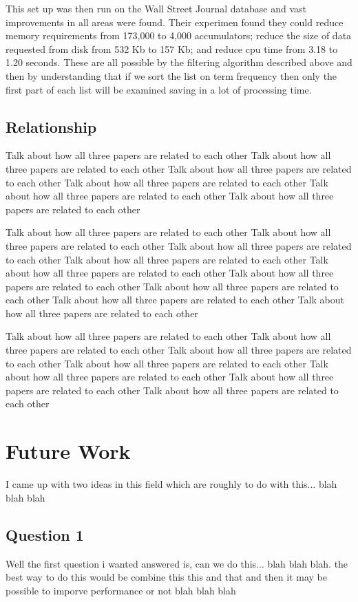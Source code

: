 \documentclass{acm_proc_article-sp}
\begin{document}
This set up was then run on the Wall Street Journal database and vast improvements in all areas were found. Their experimen found they could reduce memory requirements from 173,000 to 4,000 accumulators; reduce the size of data requested from disk from 532 Kb to 157 Kb; and reduce cpu time from 3.18 to 1.20 seconds. These are all possible by the filtering algorithm described above and then by understanding that if we sort the list on term frequency then only the first part of each list will be examined saving in a lot of processing time.

\subsection{Relationship}
Talk about how all three papers are related to each other
Talk about how all three papers are related to each other
Talk about how all three papers are related to each other
Talk about how all three papers are related to each other
Talk about how all three papers are related to each other
Talk about how all three papers are related to each other

Talk about how all three papers are related to each other
Talk about how all three papers are related to each other
Talk about how all three papers are related to each other
Talk about how all three papers are related to each other
Talk about how all three papers are related to each other
Talk about how all three papers are related to each other
Talk about how all three papers are related to each other
Talk about how all three papers are related to each other
Talk about how all three papers are related to each other

Talk about how all three papers are related to each other
Talk about how all three papers are related to each other
Talk about how all three papers are related to each other
Talk about how all three papers are related to each other
Talk about how all three papers are related to each other
Talk about how all three papers are related to each other
Talk about how all three papers are related to each other

\section{Future Work}
I came up with two ideas in this field which are roughly to do with this... blah blah blah

\subsection{Question 1}
Well the first question i wanted answered is, can we do this... blah blah blah. the best way to do this would be combine this this and that and then it may be possible to imporve performance or not blah blah blah
\end{document}
